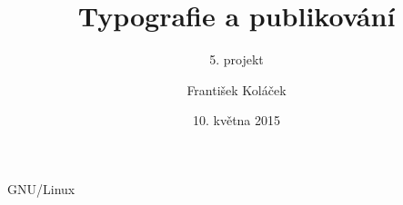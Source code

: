 \documentclass[pdf,slideColor,fyma]{prosper}
\begin{document}
\title{Typografie a publikování}
\subtitle{5. projekt}
\author{František Koláček}
\date{10. května 2015}
\maketitle

\begin{slide}{GNU/Linux}
\begin{figure}[ht]
\begin{center}
\end{center}
\end{figure}
\end{slide}
\end{document}
